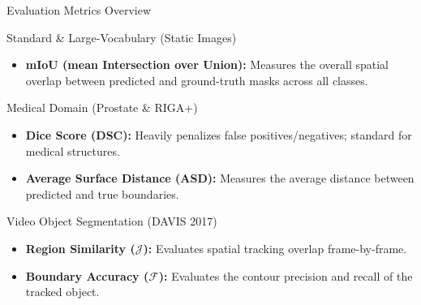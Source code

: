 \documentclass[aspectratio=169, 10pt]{beamer}
\begin{document}
\begin{frame}{Evaluation Metrics Overview}
    \begin{block}{Standard \& Large-Vocabulary (Static Images)}
        \begin{itemize}
            \item \textbf{mIoU (mean Intersection over Union):} Measures the overall spatial overlap between predicted and ground-truth masks across all classes.
        \end{itemize}
    \end{block}
    
    \begin{block}{Medical Domain (Prostate \& RIGA+)}
        \begin{itemize}
            \item \textbf{Dice Score (DSC):} Heavily penalizes false positives/negatives; standard for medical structures.
            \item \textbf{Average Surface Distance (ASD):} Measures the average distance between predicted and true boundaries.
        \end{itemize}
    \end{block}

    \begin{block}{Video Object Segmentation (DAVIS 2017)}
        \begin{itemize}
            \item \textbf{Region Similarity ($\mathcal{J}$):} Evaluates spatial tracking overlap frame-by-frame.
            \item \textbf{Boundary Accuracy ($\mathcal{F}$):} Evaluates the contour precision and recall of the tracked object.
        \end{itemize}
    \end{block}
\end{frame}
\end{document}

